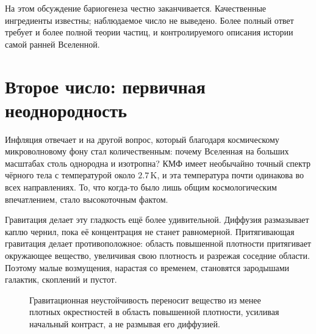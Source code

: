 На этом обсуждение бариогенеза честно заканчивается. Качественные ингредиенты известны; наблюдаемое число не выведено. Более полный ответ требует и более полной теории частиц, и контролируемого описания истории самой ранней Вселенной.

\section{Второе число: первичная неоднородность}

Инфляция отвечает и на другой вопрос, который благодаря космическому микроволновому фону стал количественным: почему Вселенная на больших масштабах столь однородна и изотропна? КМФ имеет необычайно точный спектр чёрного тела с температурой около \(2.7\,\mathrm K\), и эта температура почти одинакова во всех направлениях. То, что когда-то было лишь общим космологическим впечатлением, стало высокоточным фактом.

Гравитация делает эту гладкость ещё более удивительной. Диффузия размазывает каплю чернил, пока её концентрация не станет равномерной. Притягивающая гравитация делает противоположное: область повышенной плотности притягивает окружающее вещество, увеличивая свою плотность и разрежая соседние области. Поэтому малые возмущения, нарастая со временем, становятся зародышами галактик, скоплений и пустот.

\begin{figure}[htbp]
\centering
\begin{coursefitfigure}
\end{coursefitfigure}
\caption{Гравитационная неустойчивость переносит вещество из менее плотных окрестностей в область повышенной плотности, усиливая начальный контраст, а не размывая его диффузией.}
\label{fig:c08-gravity-growth}
\end{figure}

